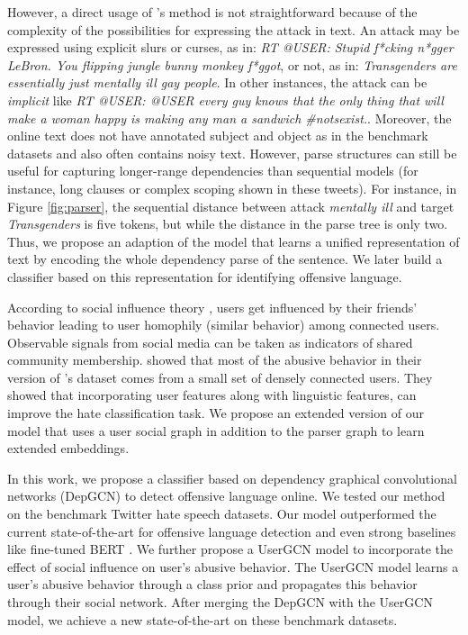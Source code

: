 However, a direct usage of \citet{zhang-graph}'s method is not straightforward because of the complexity of the possibilities for expressing the attack in text.
An attack may be expressed using explicit slurs or curses, as in: \emph{RT @USER: Stupid f*cking n*gger LeBron. You flipping jungle bunny monkey f*ggot}, or not, as in: \emph{Transgenders are essentially just mentally ill gay people}. In other instances, the attack can be \emph{implicit} like \emph{RT @USER: @USER every guy knows that the only thing that will make a woman happy is making any man a sandwich \#notsexist.}.
Moreover, the online text does not have annotated subject and object as in the benchmark datasets \cite{zhang-graph} and also often contains noisy text. However, parse structures can still be useful for capturing longer-range dependencies than sequential models (for instance, long clauses or complex scoping shown in these tweets). For instance, in Figure \ref{fig:parser}, the sequential distance between attack \emph{mentally ill} and target \emph{Transgenders} is five tokens, but while the distance in the parse tree is only two. Thus, we propose an adaption of the \cite{zhang-graph} model that learns a unified representation of text by encoding the whole dependency parse of the sentence. We later build a classifier based on this representation for identifying offensive language.

According to social influence theory \cite{social_influence}, users get influenced by their friends' behavior leading to user homophily \cite{homophily} (similar behavior) among connected users. Observable signals from social media can be taken as indicators of shared community membership.
\cite{mishra2019abusive} showed that most of the abusive behavior in their version of \citet{waseem-hovy-2016}'s dataset comes from a small set of densely connected users. They showed that incorporating user features along with linguistic features, can improve the hate classification task. We propose an extended version of our model that uses a user social graph in addition to the parser graph to learn extended embeddings.

In this work, we propose a classifier based on dependency graphical convolutional networks (DepGCN) to detect offensive language online. We tested our method on the benchmark Twitter hate speech datasets. Our model outperformed the current state-of-the-art \cite{waseem-hovy-2016, davidson2017automated} for offensive language detection and even strong baselines like fine-tuned BERT \cite{devlin2019bert}. We further propose a UserGCN model to incorporate the effect of social influence on user's abusive behavior. The UserGCN model learns a user's abusive behavior through a class prior and propagates this behavior through their social network. After merging the DepGCN with the UserGCN model, we achieve a new state-of-the-art on these benchmark datasets.
